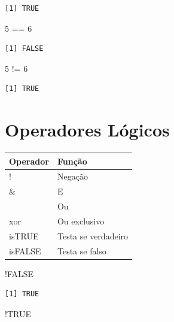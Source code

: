 \documentclass[
  letterpaper,
  DIV=11,
  numbers=noendperiod]{scrreprt}
\newenvironment{Shaded}{\begin{snugshade}}{\end{snugshade}}
\newcommand{\ConstantTok}[1]{\textcolor[rgb]{0.56,0.35,0.01}{#1}}
\newcommand{\DecValTok}[1]{\textcolor[rgb]{0.68,0.00,0.00}{#1}}
\newcommand{\SpecialCharTok}[1]{\textcolor[rgb]{0.37,0.37,0.37}{#1}}
\begin{document}
\begin{verbatim}
[1] TRUE
\end{verbatim}

\begin{Shaded}
\begin{Highlighting}[]
\DecValTok{5} \SpecialCharTok{==} \DecValTok{6}
\end{Highlighting}
\end{Shaded}

\begin{verbatim}
[1] FALSE
\end{verbatim}

\begin{Shaded}
\begin{Highlighting}[]
\DecValTok{5} \SpecialCharTok{!=} \DecValTok{6}
\end{Highlighting}
\end{Shaded}

\begin{verbatim}
[1] TRUE
\end{verbatim}

\hypertarget{operadores-luxf3gicos}{%
\section{Operadores Lógicos}\label{operadores-luxf3gicos}}

\begin{longtable}[]{@{}ll@{}}
\toprule()
Operador & Função \\
\midrule()
\endhead
! & Negação \\
\& & E \\
\textbar{} & Ou \\
xor & Ou exclusivo \\
isTRUE & Testa se verdadeiro \\
isFALSE & Testa se falso \\
\bottomrule()
\end{longtable}

\begin{Shaded}
\begin{Highlighting}[]
\SpecialCharTok{!}\ConstantTok{FALSE}
\end{Highlighting}
\end{Shaded}

\begin{verbatim}
[1] TRUE
\end{verbatim}

\begin{Shaded}
\begin{Highlighting}[]
\SpecialCharTok{!}\ConstantTok{TRUE}
\end{Highlighting}
\end{Shaded}
\end{document}
